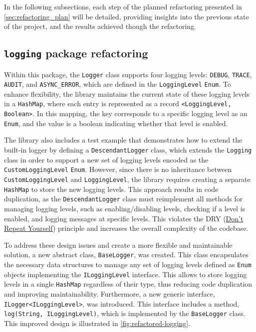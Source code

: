 In the following subsections, each step of the planned refactoring presented in \autoref{sec:refactoring_plan} will be detailed, providing insights into the previous state of the project, and the results achieved though the refactoring.

\subsection{\texttt{logging} package refactoring}

Within this package, the \texttt{Logger} class supports four logging levels: \texttt{DEBUG}, \texttt{TRACE}, \texttt{AUDIT}, and \texttt{ASYNC\_ERROR}, which are defined in the \texttt{LoggingLevel} \texttt{Enum}. To enhance flexibility, the library maintains the current state of these logging levels in a \texttt{HashMap}, where each entry is represented as a record \texttt{<LoggingLevel, Boolean>}. In this mapping, the key corresponds to a specific logging level as an \texttt{Enum}, and the value is a boolean indicating whether that level is enabled.

The library also includes a test example that demonstrates how to extend the built-in logger by defining a \texttt{DescendantLogger} class, which extends the \texttt{Logging} class in order to support a new set of logging levels encoded as the \texttt{CustomLoggingLevel} \texttt{Enum}. However, since there is no inheritance between \texttt{CustomLoggingLevel} and \texttt{LoggingLevel}, the library requires creating a separate \texttt{HashMap} to store the new logging levels. This approach results in code duplication, as the \texttt{DescendantLogger} class must reimplement all methods for managing logging levels, such as enabling/disabling levels, checking if a level is enabled, and logging messages at specific levels. This violates the DRY (\href{https://en.wikipedia.org/wiki/Don%27t_repeat_yourself}{Don't Repeat Yourself}) principle and increases the overall complexity of the codebase.

To address these design issues and create a more flexible and maintainable solution, a new abstract class, \texttt{BaseLogger}, was created. This class encapsulates the necessary data structures to manage any set of logging levels defined as \texttt{Enum} objects implementing the \texttt{ILoggingLevel} interface. This allows to store logging levels in a single \texttt{HashMap} regardless of their type, thus reducing code duplication and improving maintainability. Furthermore, a new generic interface, \texttt{ILogger<ILoggingLevel>}, was introduced. This interface includes a method, \texttt{log(String, ILoggingLevel)}, which is implemented by the \texttt{BaseLogger} class. This improved design is illustrated in \autoref{fig:refactored-logging}.

